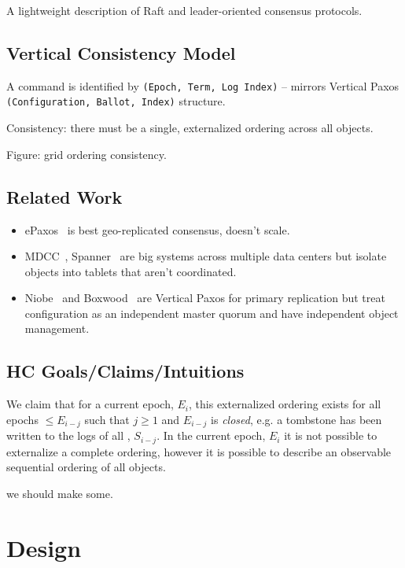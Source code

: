 \documentclass[10pt,twocolumn]{article}
\begin{document}
A lightweight description of Raft and leader-oriented consensus protocols.

\subsection*{Vertical Consistency Model}

A command is identified by \texttt{(Epoch, Term, Log Index)} -- mirrors
Vertical Paxos \texttt{(Configuration, Ballot, Index)} structure.

Consistency: there must be a single, externalized ordering across all
objects.

Figure: grid ordering consistency.

\subsection*{Related Work}

\begin{itemize}
    \item ePaxos~\cite{epaxos} is best geo-replicated consensus, doesn't
    scale.
    \item MDCC~\cite{mdcc}, Spanner~\cite{spanner} are big systems across
    multiple data centers but isolate objects into tablets that aren't
    coordinated.
    \item Niobe~\cite{niobe} and Boxwood~\cite{boxwood} are Vertical Paxos
    for primary replication but treat configuration as an independent master
    quorum and have independent object management.
\end{itemize}

\subsection*{HC Goals/Claims/Intuitions}

 We claim that for a current epoch, $E_i$, this externalized ordering exists
for all epochs $\leq E_{i-j}$ such that $j\geq1$ and $E_{i-j}$ is
\emph{closed}, e.g. a tombstone has been written to the logs of all \subs,
$S_{i-j}$.
In the current epoch, $E_i$ it is not possible to externalize a complete
ordering,  however it is possible to describe an observable sequential
ordering of all objects.

 we should make some.

\section*{Design}
\end{document}
